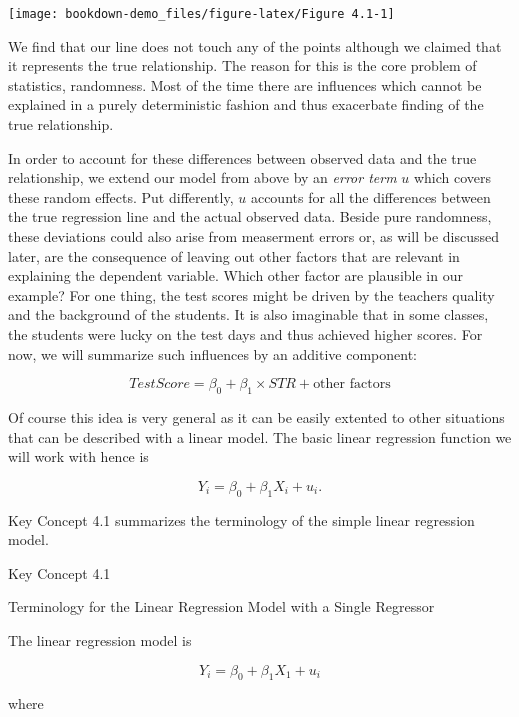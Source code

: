 \documentclass[]{book}
\theoremstyle{definition}
\theoremstyle{definition}
\theoremstyle{definition}
\theoremstyle{remark}
\begin{document}
\begin{center}\texttt{[image: bookdown-demo\_files/figure-latex/Figure 4.1-1]} \end{center}

We find that our line does not touch any of the points although we
claimed that it represents the true relationship. The reason for this is
the core problem of statistics, randomness. Most of the time there are
influences which cannot be explained in a purely deterministic fashion
and thus exacerbate finding of the true relationship.

In order to account for these differences between observed data and the
true relationship, we extend our model from above by an \emph{error
term} \(u\) which covers these random effects. Put differently, \(u\)
accounts for all the differences between the true regression line and
the actual observed data. Beside pure randomness, these deviations could
also arise from measerment errors or, as will be discussed later, are
the consequence of leaving out other factors that are relevant in
explaining the dependent variable. Which other factor are plausible in
our example? For one thing, the test scores might be driven by the
teachers quality and the background of the students. It is also
imaginable that in some classes, the students were lucky on the test
days and thus achieved higher scores. For now, we will summarize such
influences by an additive component:

\[ TestScore = \beta_0 + \beta_1 \times STR + \text{other factors} \]

Of course this idea is very general as it can be easily extented to
other situations that can be described with a linear model. The basic
linear regression function we will work with hence is

\[ Y_i = \beta_0 + \beta_1 X_i + u_i. \]

Key Concept 4.1 summarizes the terminology of the simple linear
regression model.

Key Concept 4.1

Terminology for the Linear Regression Model with a Single Regressor

The linear regression model is

\[Y_i = \beta_0 + \beta_1 X_1 + u_i \]

where
\end{document}
